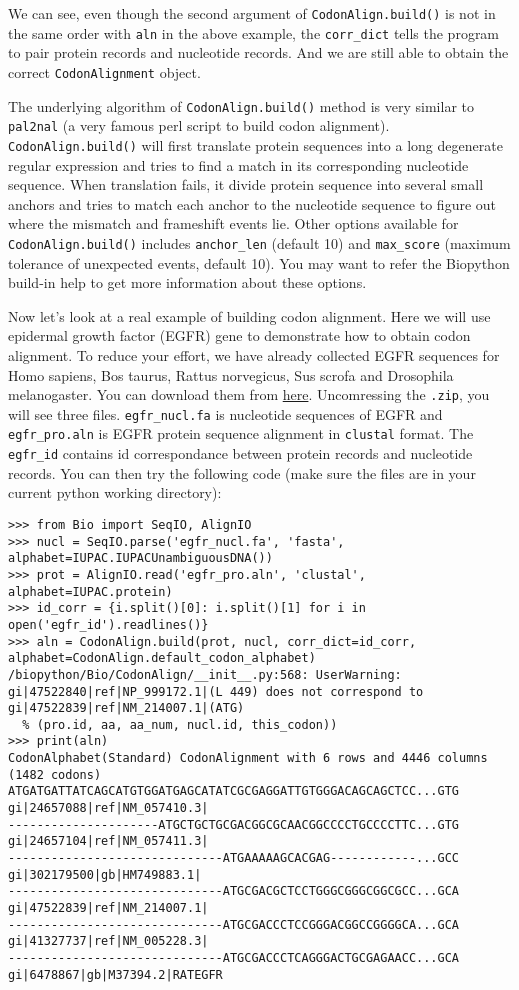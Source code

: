 We can see, even though the second argument of \verb|CodonAlign.build()|
is not in the same order with \texttt{aln} in the above example, the
\texttt{corr\_dict} tells the program to pair protein records and
nucleotide records. And we are still able to obtain the correct
\verb|CodonAlignment| object.

The underlying algorithm of \verb|CodonAlign.build()| method is very
similar to \texttt{pal2nal} (a very famous perl script to build codon
alignment). \verb|CodonAlign.build()| will first translate protein
sequences into a long degenerate regular expression and tries to find a
match in its corresponding nucleotide sequence. When translation fails,
it divide protein sequence into several small anchors and tries to match
each anchor to the nucleotide sequence to figure out where the mismatch
and frameshift events lie. Other options available for
\verb|CodonAlign.build()| includes \texttt{anchor\_len} (default 10) and
\texttt{max\_score} (maximum tolerance of unexpected events, default
10). You may want to refer the Biopython build-in help to get more
information about these options.

Now let's look at a real example of building codon alignment. Here we
will use epidermal growth factor (EGFR) gene to demonstrate how to
obtain codon alignment. To reduce your effort, we have already collected
EGFR sequences for Homo sapiens, Bos taurus, Rattus norvegicus,
Sus scrofa and Drosophila melanogaster. You can download them from
\href{http://zruanweb.com/egfr.zip}{here}. Uncomressing the
\texttt{.zip}, you will see three files. \texttt{egfr\_nucl.fa} is
nucleotide sequences of EGFR and \texttt{egfr\_pro.aln} is EGFR protein
sequence alignment in \texttt{clustal} format. The \texttt{egfr\_id}
contains id correspondance between protein records and nucleotide
records. You can then try the following code (make sure the files are in
your current python working directory):

\begin{verbatim}
>>> from Bio import SeqIO, AlignIO
>>> nucl = SeqIO.parse('egfr_nucl.fa', 'fasta', alphabet=IUPAC.IUPACUnambiguousDNA())
>>> prot = AlignIO.read('egfr_pro.aln', 'clustal', alphabet=IUPAC.protein)
>>> id_corr = {i.split()[0]: i.split()[1] for i in open('egfr_id').readlines()}
>>> aln = CodonAlign.build(prot, nucl, corr_dict=id_corr, alphabet=CodonAlign.default_codon_alphabet)
/biopython/Bio/CodonAlign/__init__.py:568: UserWarning: gi|47522840|ref|NP_999172.1|(L 449) does not correspond to gi|47522839|ref|NM_214007.1|(ATG)
  % (pro.id, aa, aa_num, nucl.id, this_codon))
>>> print(aln)
CodonAlphabet(Standard) CodonAlignment with 6 rows and 4446 columns (1482 codons)
ATGATGATTATCAGCATGTGGATGAGCATATCGCGAGGATTGTGGGACAGCAGCTCC...GTG gi|24657088|ref|NM_057410.3|
---------------------ATGCTGCTGCGACGGCGCAACGGCCCCTGCCCCTTC...GTG gi|24657104|ref|NM_057411.3|
------------------------------ATGAAAAAGCACGAG------------...GCC gi|302179500|gb|HM749883.1|
------------------------------ATGCGACGCTCCTGGGCGGGCGGCGCC...GCA gi|47522839|ref|NM_214007.1|
------------------------------ATGCGACCCTCCGGGACGGCCGGGGCA...GCA gi|41327737|ref|NM_005228.3|
------------------------------ATGCGACCCTCAGGGACTGCGAGAACC...GCA gi|6478867|gb|M37394.2|RATEGFR
\end{verbatim}

